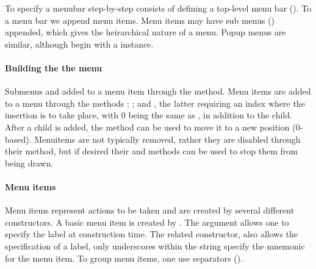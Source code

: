 To specify a menubar step-by-step consists of defining a top-level
menu bar (). To a menu bar we append menu
items. Menu items may have sub menus () appended, which gives
the heirarchical nature of a menu. Popup menus are similar, although begin with a  instance.  

\paragraph{Building the the menu}
Submenus and added to a menu item through the
 method. Menu items are added to a
menu through the methods
; ; and
, the latter requiring an index where the
insertion is to take place, with 0 being the same as ,
in addition to the child. After a child is added, the method
 can be used to move it to a new
position ($0$-based). Menuitems are not typically removed, rather they
are disabled through their  method, but if desired
their  and  methods
can be used to stop them from being drawn.


\paragraph{Menu items}
Menu items represent actions to be taken and are created by several
different constructors.  A basic menu item is created by
. The argument 
allows one to specify the label at construction time. The related
constructor,  also allows the
specification of a label, only underscores within the string specify
the mnemonic for the menu item.  To group menu items, one use
separators ().

